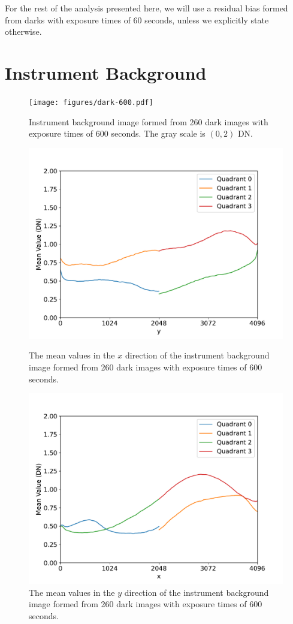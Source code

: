\documentclass{article}
\begin{document}
For the rest of the analysis presented here, we will use a residual bias formed from darks with exposure times of 60 seconds, unless we explicitly state otherwise.

\clearpage
\section{Instrument Background}

\begin{figure}[pb]
\begin{center}
\texttt{[image: figures/dark-600.pdf]}
\medskip
\caption{Instrument background image formed from 260 dark images with exposure times of 600 seconds. The gray scale is $(0,2)$ DN.}
\label{figure:dark-600}
\end{center}
\end{figure}

\begin{figure}[pb]
\begin{center}
\includegraphics[width=0.7\columnwidth]{figures/dark-600-y.pdf}
\medskip
\caption{The mean values in the $x$ direction of the instrument background image formed from 260 dark images with exposure times of 600 seconds.}
\label{figure:dark-600-y}
\end{center}
\begin{center}
\includegraphics[width=0.7\columnwidth]{figures/dark-600-x.pdf}
\medskip
\caption{The mean values in the $y$ direction of the instrument background image formed from 260 dark images with exposure times of 600 seconds.}
\label{figure:dark-600-x}
\end{center}
\end{figure}
\end{document}
